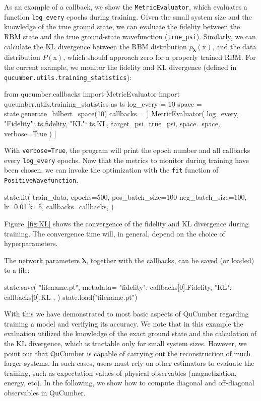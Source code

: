 \documentclass[submission, Phys, hidelnks]{SciPost}
\newcommand{\x}{\bm{\mathrm{x}}}
\begin{document}
As an example of a callback, we show the \verb|MetricEvaluator|, which
evaluates a function \verb|log_every| epochs during training.
Given the small system size and the knowledge of the true ground state, we can
evaluate the fidelity between the RBM state and the true ground-state
wavefunction (\verb|true_psi|).
Similarly, we can calculate the KL divergence between the RBM distribution
$p_{\bm{\lambda}}(\x)$, and the data distribution $P(\x)$, which should
approach zero for a properly trained RBM.\@
For the current example, we monitor the fidelity and KL divergence (defined in
\verb|qucumber.utils.training_statistics|):
\begin{python}
from qucumber.callbacks import MetricEvaluator
import qucumber.utils.training_statistics as ts
log_every = 10
space = state.generate_hilbert_space(10)
callbacks = [
    MetricEvaluator(
        log_every,
        {"Fidelity": ts.fidelity, "KL": ts.KL},
        target_psi=true_psi,
        space=space,
        verbose=True
    )
]
\end{python}
With \verb|verbose=True|, the program will print the epoch number and all
callbacks every \verb|log_every| epochs. Now that the metrics to monitor during
training have been chosen, we can invoke the optimization with the \verb|fit|
function of \verb|PositiveWavefunction|.
\begin{python}
state.fit(
    train_data,
    epochs=500,
    pos_batch_size=100
    neg_batch_size=100,
    lr=0.01
    k=5,
    callbacks=callbacks,
)
\end{python}

Figure~\ref{fig:KL} shows the convergence of the fidelity and KL divergence
during training. The convergence time will, in general, depend on the choice
of hyperparameters.

The network parameters $\bm{\lambda}$, together with the callbacks, can be
saved (or loaded) to a file:
\begin{python}
state.save(
    "filename.pt",
    metadata={
        "fidelity": callbacks[0].Fidelity,
        "KL": callbacks[0].KL
    },
)
state.load("filename.pt")
\end{python}


With this we have demonstrated to most basic aspects of QuCumber regarding
training a model and verifying its accuracy. We note that in this example the
evaluation utilized the knowledge of the exact ground state and the calculation
of the KL divergence, which is tractable only for small system sizes.  However,
we point out that QuCumber is capable of carrying out the reconstruction of much
larger systems. In such cases, users must rely on other estimators to evaluate
the training, such as expectation values of physical observables (magnetization,
energy, etc). In the following, we show how to compute diagonal and
off-diagonal observables in QuCumber.
\end{document}
